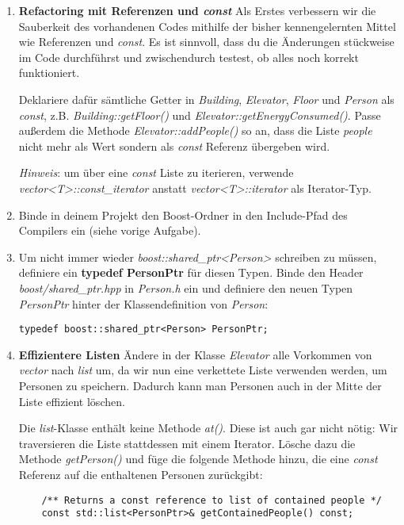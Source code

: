 \begin{enumerate}
\item \textbf{Refactoring mit Referenzen und \emph{const}}
Als Erstes verbessern wir die Sauberkeit des vorhandenen Codes mithilfe der bisher kennengelernten Mittel wie Referenzen und \emph{const}.
Es ist sinnvoll, dass du die Änderungen stückweise im Code durchführst und zwischendurch testest, ob alles noch korrekt funktioniert.

Deklariere dafür sämtliche Getter in \emph{Building}, \emph{Elevator}, \emph{Floor} und \emph{Person} als \emph{const}, z.B. \emph{Building::getFloor()} und \emph{Elevator::getEnergyConsumed()}.
Passe außerdem die Methode \emph{Elevator::addPeople()} so an, dass die Liste \emph{people} nicht mehr als Wert sondern als \emph{const} Referenz übergeben wird.

\emph{Hinweis}: um über eine \emph{const} Liste zu iterieren, verwende \emph{vector<T>::const\_iterator} anstatt \emph{vector<T>::iterator} als Iterator-Typ.

\item
Binde in deinem Projekt den Boost-Ordner in den Include-Pfad des Compilers ein (siehe vorige Aufgabe).

\item Um nicht immer wieder \emph{boost::shared\_ptr<Person>} schreiben zu müssen, definiere ein \textbf{typedef PersonPtr} für diesen Typen.
Binde den Header \emph{boost/shared\_ptr.hpp} in \emph{Person.h} ein und definiere den neuen Typen \emph{PersonPtr} hinter der Klassendefinition von \emph{Person}:

\begin{lstlisting}
typedef boost::shared_ptr<Person> PersonPtr;
\end{lstlisting}

\item \textbf{Effizientere Listen}
Ändere in der Klasse \emph{Elevator} alle Vorkommen von \emph{vector} nach \emph{list} um, da wir nun eine verkettete Liste verwenden werden, um Personen zu speichern.
Dadurch kann man Personen auch in der Mitte der Liste effizient löschen.

Die \emph{list}-Klasse enthält keine Methode \emph{at()}.
Diese ist auch gar nicht nötig:
Wir traversieren die Liste stattdessen mit einem Iterator. 
Lösche dazu die Methode \emph{getPerson()} und füge die folgende Methode hinzu, die eine \emph{const} Referenz auf die enthaltenen Personen zurückgibt:

\begin{lstlisting}
	/** Returns a const reference to list of contained people */
	const std::list<PersonPtr>& getContainedPeople() const;
\end{lstlisting}


\end{enumerate}

